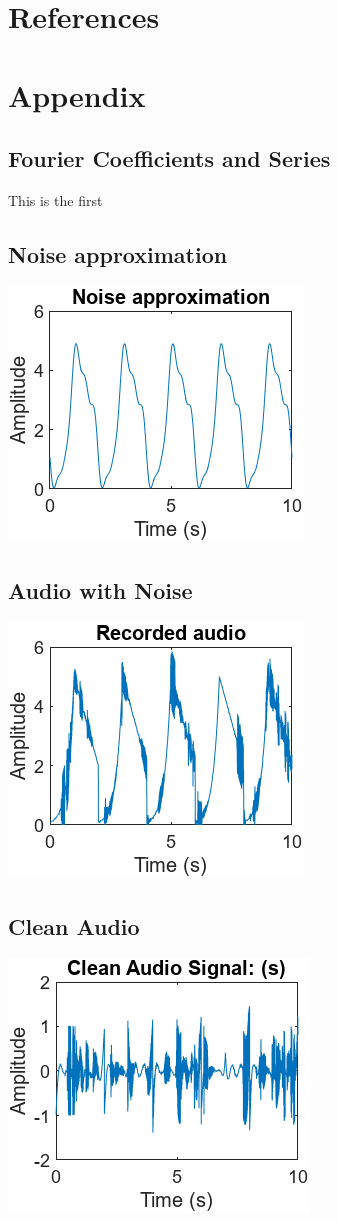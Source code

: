 \documentclass{article}
\begin{document}
\pagebreak
\section{References}


\pagebreak
\appendix
\section{Appendix}
\subsection{Fourier Coefficients and Series}
\label{sec:Fourier}
This is the first
\subsection{Noise approximation}
\label{sec: nApprox}
\includegraphics{nApprox.png}
\subsection{Audio with Noise}
\label{sec: Audio}
\includegraphics{AudioOutput.png}
\subsection{Clean Audio}
\label{sec: CleanAudio}
\includegraphics{CleanAudio.png}
\end{document}
